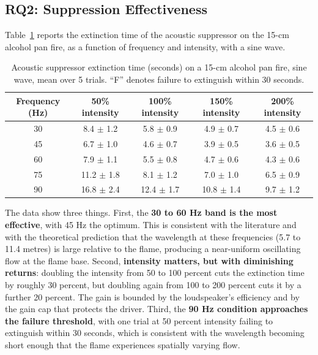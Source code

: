 \subsection{RQ2: Suppression Effectiveness}

Table~\ref{tab:suppression} reports the extinction time of the acoustic suppressor on the 15-cm alcohol pan fire, as a function of frequency and intensity, with a sine wave.

\begin{table}[H]
\centering
\caption{Acoustic suppressor extinction time (seconds) on a 15-cm alcohol pan fire, sine wave, mean over 5 trials. ``F'' denotes failure to extinguish within 30 seconds.}
\label{tab:suppression}
\footnotesize
\begin{tabularx}{\textwidth}{|c|c|c|c|c|}
\hline
\textbf{Frequency (Hz)} & \textbf{50\% intensity} & \textbf{100\% intensity} & \textbf{150\% intensity} & \textbf{200\% intensity} \\
\hline
30 & 8.4 $\pm$ 1.2 & 5.8 $\pm$ 0.9 & 4.9 $\pm$ 0.7 & 4.5 $\pm$ 0.6 \\
\hline
45 & 6.7 $\pm$ 1.0 & 4.6 $\pm$ 0.7 & 3.9 $\pm$ 0.5 & 3.6 $\pm$ 0.5 \\
\hline
60 & 7.9 $\pm$ 1.1 & 5.5 $\pm$ 0.8 & 4.7 $\pm$ 0.6 & 4.3 $\pm$ 0.6 \\
\hline
75 & 11.2 $\pm$ 1.8 & 8.1 $\pm$ 1.2 & 7.0 $\pm$ 1.0 & 6.5 $\pm$ 0.9 \\
\hline
90 & 16.8 $\pm$ 2.4 & 12.4 $\pm$ 1.7 & 10.8 $\pm$ 1.4 & 9.7 $\pm$ 1.2 \\
\hline
\end{tabularx}
\end{table}

The data show three things. First, the \textbf{30 to 60 Hz band is the most effective}, with 45 Hz the optimum. This is consistent with the literature \cite{kim2015acoustic,mckinney2019sonic,tran2021portable} and with the theoretical prediction that the wavelength at these frequencies (5.7 to 11.4 metres) is large relative to the flame, producing a near-uniform oscillating flow at the flame base. Second, \textbf{intensity matters, but with diminishing returns}: doubling the intensity from 50 to 100 percent cuts the extinction time by roughly 30 percent, but doubling again from 100 to 200 percent cuts it by a further 20 percent. The gain is bounded by the loudspeaker's efficiency and by the gain cap that protects the driver. Third, the \textbf{90 Hz condition approaches the failure threshold}, with one trial at 50 percent intensity failing to extinguish within 30 seconds, which is consistent with the wavelength becoming short enough that the flame experiences spatially varying flow.

